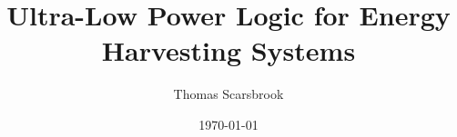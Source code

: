\documentclass{IEEEtran}
\author{Thomas Scarsbrook}
\title{Ultra-Low Power Logic for Energy Harvesting Systems}
\date{\today}
\begin{document}
\maketitle


\begin{abstract}

\end{abstract}











\end{document}
